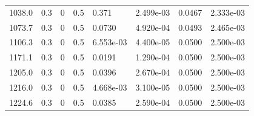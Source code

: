 \documentclass[preview]{standalone}
\begin{document}
{{\begin{tabular}{L{1.2cm}C{1.2cm} C{0.3cm}C{0.5cm} C{1.4cm}C{1.4cm} C{1.4cm}C{1.4cm}}
  1038.0  &   0.3  & 0     & 0.5 &  0.371  & 2.499e-03  & 0.0467 &  2.333e-03   \\ 
  1073.7  &   0.3  & 0     & 0.5 &  0.0730  & 4.920e-04  & 0.0493 &  2.465e-03   \\ 
  1106.3  &   0.3  & 0     & 0.5 &  6.553e-03  & 4.400e-05  & 0.0500 &  2.500e-03   \\ 
  1171.1  &   0.3  & 0     & 0.5 &  0.0191  & 1.290e-04  & 0.0500 &  2.500e-03   \\ 
  1205.0  &   0.3  & 0     & 0.5 &  0.0396  & 2.670e-04  & 0.0500 &  2.500e-03   \\ 
  1216.0  &   0.3  & 0     & 0.5 &  4.668e-03  & 3.100e-05  & 0.0500 &  2.500e-03   \\ 
  1224.6  &   0.3  & 0     & 0.5 &  0.0385  & 2.590e-04  & 0.0500 &  2.500e-03   \\ 
\hline 
\end{tabular} 

}}
\end{document}
